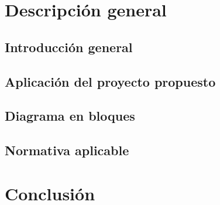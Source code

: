 \documentclass[
    11pt,
    spanish,
	a4paper
]{article}
\begin{document}
\section{Descripción general}
\label{sec:descripcion}

\subsection{Introducción general}
\label{subsec:teorica}

\subsection{Aplicación del proyecto propuesto}
\label{subsec:aplicacion}

\subsection{Diagrama en bloques}
\label{subsec:bloques}

\subsection{Normativa aplicable}
\label{subsec:normativa}

\section{Conclusión}
\label{suc:conclusion}
\end{document}

